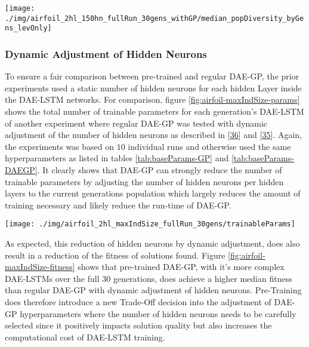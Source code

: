 \documentclass[
  11pt,
]{article}
\let\origfigure\figure
\let\endorigfigure\endfigure
\renewenvironment{figure}[1][2] {
    \expandafter\origfigure\expandafter[H]
} {
    \endorigfigure
}
\begin{document}
\begin{figure}[c]

{\centering \texttt{[image: ./img/airfoil\_2hl\_150hn\_fullRun\_30gens\_withGP/median\_popDiversity\_byGens\_levOnly]} 

}

\caption{Median Population Diversity over 30 Generations - Airfoil}\label{fig:airfoil-popDiversity}
\end{figure}

\hypertarget{dynamic-adjustment-of-hidden-neurons}{%
\subsubsection{Dynamic Adjustment of Hidden Neurons}\label{dynamic-adjustment-of-hidden-neurons}}

To ensure a fair comparison between pre-trained and regular DAE-GP, the prior experiments used a static number of hidden neurons for each hidden Layer inside the DAE-LSTM networks.
For comparison, figure \ref{fig:airfoil-maxIndSize-params} shows the total number of trainable parameters for each generation's DAE-LSTM of another experiment where regular DAE-GP was tested with dynamic adjustment of the number of hidden neurons as described in {[}\protect\hyperlink{ref-dae-gp_2020_rtree}{36}{]} and {[}\protect\hyperlink{ref-dae-gp_2022_symreg}{35}{]}.
Again, the experiments was based on \(10\) individual runs and otherwise used the same hyperparameters as listed in tables \ref{tab:baseParams-GP} and \ref{tab:baseParams-DAEGP}.
It clearly shows that DAE-GP can strongly reduce the number of trainable parameters by adjusting the number of hidden neurons per hidden layers to the current generations population which largely reduces the amount of training necessary and likely reduce the run-time of DAE-GP.

\begin{figure}[c]

{\centering \texttt{[image: ./img/airfoil\_2hl\_maxIndSize\_fullRun\_30gens/trainableParams]} 

}

\caption{Median Number of trainable Parameters over 30 Generations - Airfoil - Dynamic adjustment of regular DAE-GP}\label{fig:airfoil-maxIndSize-params}
\end{figure}

As expected, this reduction of hidden neurons by dynamic adjustment, does also result in a reduction of the fitness of solutions found.
Figure \ref{fig:airfoil-maxIndSize-fitness} shows that pre-trained DAE-GP, with it's more complex DAE-LSTMs over the full 30 generations, does achieve a higher median fitness than regular DAE-GP with dynamic adjustment of hidden neurons.
Pre-Training does therefore introduce a new Trade-Off decision into the adjustment of DAE-GP hyperparameters where the number of hidden neurons needs to be carefully selected since it positively impacts solution quality but also increases the computational cost of DAE-LSTM training.
\end{document}
